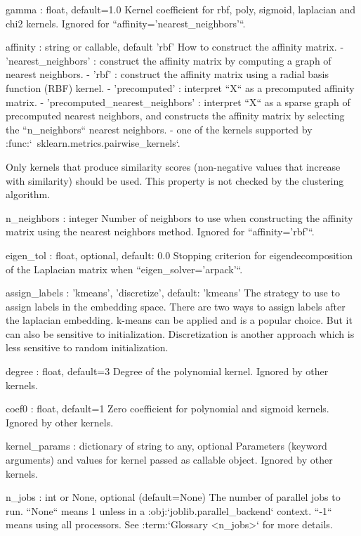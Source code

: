 \begin{DoxyVerb}
gamma : float, default=1.0
    Kernel coefficient for rbf, poly, sigmoid, laplacian and chi2 kernels.
    Ignored for ``affinity='nearest_neighbors'``.

affinity : string or callable, default 'rbf'
    How to construct the affinity matrix.
     - 'nearest_neighbors' : construct the affinity matrix by computing a
       graph of nearest neighbors.
     - 'rbf' : construct the affinity matrix using a radial basis function
       (RBF) kernel.
     - 'precomputed' : interpret ``X`` as a precomputed affinity matrix.
     - 'precomputed_nearest_neighbors' : interpret ``X`` as a sparse graph
       of precomputed nearest neighbors, and constructs the affinity matrix
       by selecting the ``n_neighbors`` nearest neighbors.
     - one of the kernels supported by
       :func:`~sklearn.metrics.pairwise_kernels`.

    Only kernels that produce similarity scores (non-negative values that
    increase with similarity) should be used. This property is not checked
    by the clustering algorithm.

n_neighbors : integer
    Number of neighbors to use when constructing the affinity matrix using
    the nearest neighbors method. Ignored for ``affinity='rbf'``.

eigen_tol : float, optional, default: 0.0
    Stopping criterion for eigendecomposition of the Laplacian matrix
    when ``eigen_solver='arpack'``.

assign_labels : {'kmeans', 'discretize'}, default: 'kmeans'
    The strategy to use to assign labels in the embedding
    space. There are two ways to assign labels after the laplacian
    embedding. k-means can be applied and is a popular choice. But it can
    also be sensitive to initialization. Discretization is another approach
    which is less sensitive to random initialization.

degree : float, default=3
    Degree of the polynomial kernel. Ignored by other kernels.

coef0 : float, default=1
    Zero coefficient for polynomial and sigmoid kernels.
    Ignored by other kernels.

kernel_params : dictionary of string to any, optional
    Parameters (keyword arguments) and values for kernel passed as
    callable object. Ignored by other kernels.

n_jobs : int or None, optional (default=None)
    The number of parallel jobs to run.
    ``None`` means 1 unless in a :obj:`joblib.parallel_backend` context.
    ``-1`` means using all processors. See :term:`Glossary <n_jobs>`
    for more details.


\end{DoxyVerb}
